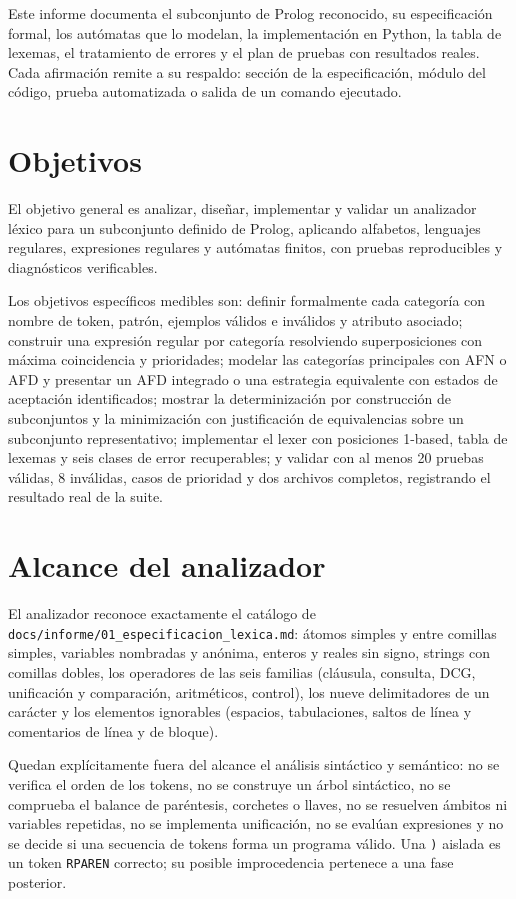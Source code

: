 \documentclass[11pt,a4paper]{article}
\begin{document}
Este informe documenta el subconjunto de Prolog reconocido, su
especificación formal, los autómatas que lo modelan, la
implementación en Python, la tabla de lexemas, el tratamiento de
errores y el plan de pruebas con resultados reales. Cada afirmación
remite a su respaldo: sección de la especificación, módulo del
código, prueba automatizada o salida de un comando ejecutado.

\section{Objetivos}
El objetivo general es analizar, diseñar, implementar y validar un
analizador léxico para un subconjunto definido de Prolog, aplicando
alfabetos, lenguajes regulares, expresiones regulares y autómatas
finitos, con pruebas reproducibles y diagnósticos verificables.

Los objetivos específicos medibles son: definir formalmente cada
categoría con nombre de token, patrón, ejemplos válidos e inválidos y
atributo asociado; construir una expresión regular por categoría
resolviendo superposiciones con máxima coincidencia y prioridades;
modelar las categorías principales con AFN o AFD y presentar un AFD
integrado o una estrategia equivalente con estados de aceptación
identificados; mostrar la determinización por construcción de
subconjuntos y la minimización con justificación de equivalencias
sobre un subconjunto representativo; implementar el lexer con
posiciones 1-based, tabla de lexemas y seis clases de error
recuperables; y validar con al menos 20 pruebas válidas, 8 inválidas,
casos de prioridad y dos archivos completos, registrando el resultado
real de la suite.

\section{Alcance del analizador}
El analizador reconoce exactamente el catálogo de
\verb|docs/informe/01_especificacion_lexica.md|: átomos simples y
entre comillas simples, variables nombradas y anónima, enteros y
reales sin signo, strings con comillas dobles, los operadores de las
seis familias (cláusula, consulta, DCG, unificación y comparación,
aritméticos, control), los nueve delimitadores de un carácter y los
elementos ignorables (espacios, tabulaciones, saltos de línea y
comentarios de línea y de bloque).

Quedan explícitamente fuera del alcance el análisis sintáctico y
semántico: no se verifica el orden de los tokens, no se construye un
árbol sintáctico, no se comprueba el balance de paréntesis, corchetes
o llaves, no se resuelven ámbitos ni variables repetidas, no se
implementa unificación, no se evalúan expresiones y no se decide si
una secuencia de tokens forma un programa válido. Una \verb|)|
aislada es un token \verb|RPAREN| correcto; su posible improcedencia
pertenece a una fase posterior.
\end{document}
